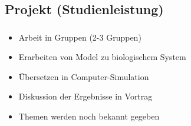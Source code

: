 \subsection{Projekt (Studienleistung)}
\label{subsec:project}
\begin{frame}
    \frametitle{\insertsubsection}
    \begin{itemize}[<+->]
        \item Arbeit in Gruppen (2-3 Gruppen)
        \item Erarbeiten von Model zu biologischem System
        \item Übersetzen in Computer-Simulation
        \item Diskussion der Ergebnisse in Vortrag
        \item Themen werden noch bekannt gegeben
    \end{itemize}
\end{frame}

